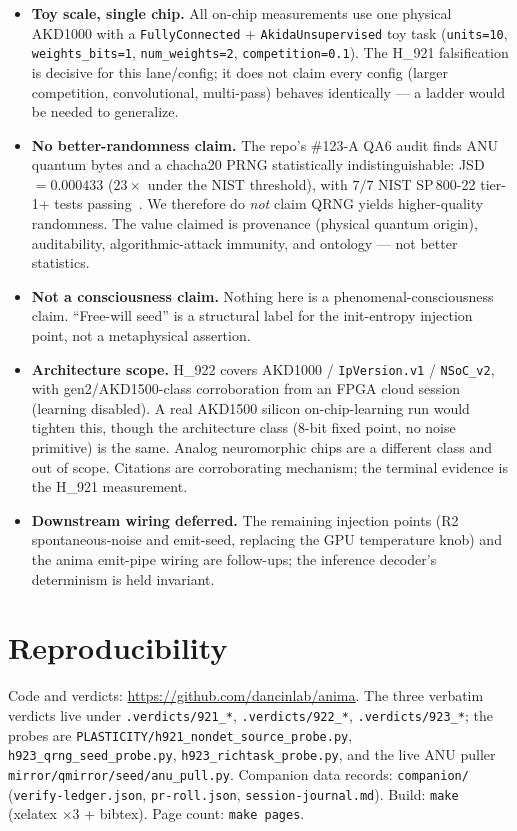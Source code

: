 \documentclass[11pt,a4paper]{article}
\providecommand{\tierOrange}{🟠}
\renewcommand{\tierOrange}{{\color{orange!85!black}\textbullet}}
\begin{document}
\begin{itemize}\itemsep0.25em
\item \textbf{Toy scale, single chip.} All on-chip measurements use one
physical AKD1000 with a \texttt{FullyConnected} + \texttt{AkidaUnsupervised}
toy task (\texttt{units=10}, \texttt{weights\_bits=1}, \texttt{num\_weights=2},
\texttt{competition=0.1}). The H\_921 falsification is decisive for this
lane/config; it does not claim every config (larger competition,
convolutional, multi-pass) behaves identically --- a ladder would be needed
to generalize.
\item \textbf{No better-randomness claim.} The repo's \#123-A QA6 audit
finds ANU quantum bytes and a chacha20 PRNG statistically indistinguishable:
JSD \(=0.000433\) (\(23\times\) under the NIST threshold), with \(7/7\)
NIST SP\,800-22 tier-1+ tests passing~\cite{nistSP80022}. We therefore do
\emph{not} claim QRNG yields higher-quality randomness. The value claimed is
provenance (physical quantum origin), auditability, algorithmic-attack
immunity, and ontology --- not better statistics.
\item \textbf{Not a consciousness claim.} Nothing here is a
phenomenal-consciousness claim. ``Free-will seed'' is a structural label for
the init-entropy injection point, not a metaphysical assertion.
\item \textbf{Architecture scope.} H\_922 covers AKD1000 / \texttt{IpVersion.v1}
/ \texttt{NSoC\_v2}, with gen2/AKD1500-class corroboration from an FPGA cloud
session (learning disabled). A real AKD1500 silicon on-chip-learning run
would tighten this, though the architecture class (8-bit fixed point, no
noise primitive) is the same. Analog neuromorphic chips are a different
class and out of scope. Citations are corroborating mechanism; the terminal
evidence is the H\_921 measurement.
\item \textbf{Downstream wiring deferred.} The remaining injection points
(R2 spontaneous-noise and emit-seed, replacing the GPU temperature knob) and
the anima emit-pipe wiring are \tierOrange{} follow-ups; the inference
decoder's determinism is held invariant.
\end{itemize}

\section{Reproducibility}
\label{sec:repro}

Code and verdicts: \url{https://github.com/dancinlab/anima}. The three
verbatim verdicts live under \texttt{.verdicts/921\_*}, \texttt{.verdicts/922\_*},
\texttt{.verdicts/923\_*}; the probes are \texttt{PLASTICITY/h921\_nondet\_source\_probe.py},
\texttt{h923\_qrng\_seed\_probe.py}, \texttt{h923\_richtask\_probe.py}, and the
live ANU puller \texttt{mirror/qmirror/seed/anu\_pull.py}. Companion data
records: \texttt{companion/} (\texttt{verify-ledger.json},
\texttt{pr-roll.json}, \texttt{session-journal.md}). Build: \texttt{make}
(xelatex \(\times 3\) + bibtex). Page count: \texttt{make pages}.
\end{document}
